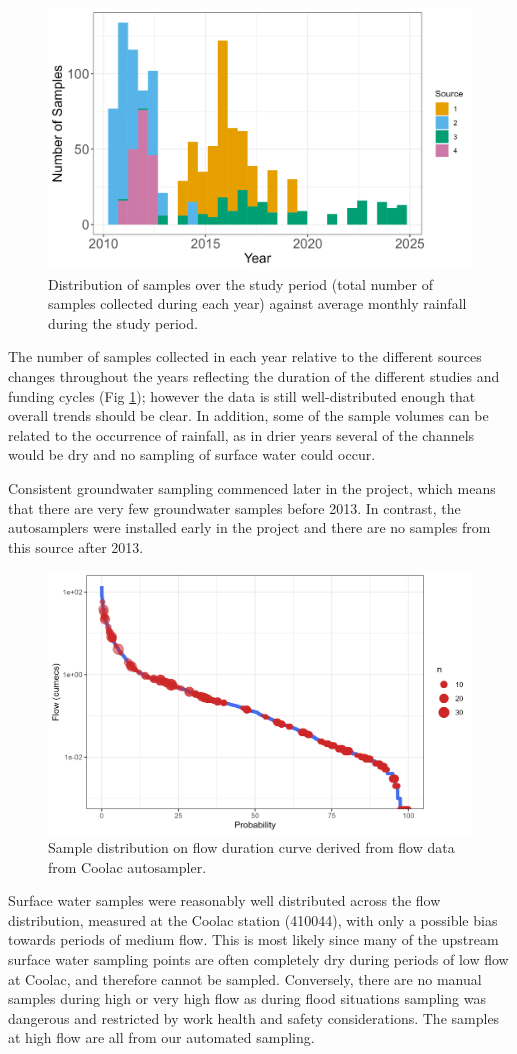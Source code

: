 \documentclass[, manuscript]{copernicus}
\begin{document}
\begin{figure}
\includegraphics[width=0.5\linewidth]{Figures/annual} \caption{Distribution of samples over the study period (total number of samples collected during each year) against average monthly rainfall during the study period. }\label{fig:annual-plot}
\end{figure}

The number of samples collected in each year relative to the different
sources changes throughout the years reflecting the duration of the
different studies and funding cycles (Fig \ref{fig:annual-plot});
however the data is still well-distributed enough that overall trends
should be clear. In addition, some of the sample volumes can be related
to the occurrence of rainfall, as in drier years several of the channels
would be dry and no sampling of surface water could occur.

Consistent groundwater sampling commenced later in the project, which
means that there are very few groundwater samples before 2013. In
contrast, the autosamplers were installed early in the project and there
are no samples from this source after 2013.

\begin{figure}
\includegraphics[width=0.8\linewidth]{Figures/FDC} \caption{Sample distribution on flow duration curve derived from flow data from Coolac autosampler.}\label{fig:FDC}
\end{figure}

Surface water samples were reasonably well distributed across the flow
distribution, measured at the Coolac station (410044), with only a
possible bias towards periods of medium flow. This is most likely since
many of the upstream surface water sampling points are often completely
dry during periods of low flow at Coolac, and therefore cannot be
sampled. Conversely, there are no manual samples during high or very
high flow as during flood situations sampling was dangerous and
restricted by work health and safety considerations. The samples at high
flow are all from our automated sampling.
\end{document}
